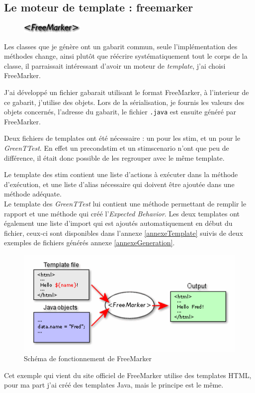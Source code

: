 		\subsection{Le moteur de template : freemarker}
		\begin{figure}
			\includegraphics[width=3cm]{contents/images/FreeMarker.png}
		\end{figure}
		Les classes que je génère ont un gabarit commun, seule l'implémentation des méthodes change, ainsi plutôt que réécrire systématiquement tout le corps de la classe, il parraissait intéressant d'avoir un moteur de \textit{template}, j'ai choisi FreeMarker.

		J'ai développé un fichier gabarait utilisant le format FreeMarker, à l'interieur de ce gabarit, j'utilise des objets. Lors de la sérialisation, je fournis les valeurs des objets concernés, l'adresse du gabarit, le fichier \texttt{.java} est ensuite généré par FreeMarker.

		Deux fichiers de templates ont été nécessaire : un pour les stim, et un pour le \textit{GreenTTest}. En effet un precondstim et un stimscenario n'ont que peu de différence, il était donc possible de les regrouper avec le même template.

		Le template des stim contient une liste d'actions à exécuter dans la méthode d'exécution, et une liste d'alias nécessaire qui doivent être ajoutée dans une méthode adéquate. \\
		Le template des \textit{GreenTTest} lui contient une méthode permettant de remplir le rapport et une méthode qui créé l'\textit{Expected Behavior}.
		Les deux templates ont également une liste d'import qui est ajoutés automatiquement en début du fichier, ceux-ci sont disponibles dans l'annexe \ref{annexeTemplate} suivis de deux exemples de fichiers générés annexe \ref{annexeGeneration}.

	
		\begin{figure}[H]
		\centering
		\includegraphics[width=12cm]{contents/images/FreeMarkerSchema.png}
		\caption{Schéma de fonctionnement de FreeMarker}
		\end{figure}
		\begin{remarque}
		Cet exemple qui vient du site officiel de FreeMarker utilise des templates HTML, pour ma part j'ai créé des templates Java, mais le principe est le même.
		\end{remarque}
